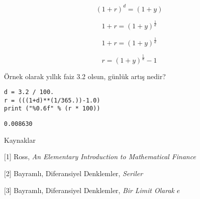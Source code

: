\documentclass[12pt,fleqn]{article}\usepackage{../../common}
\begin{document}
$$
(1+r)^d = (1+y) 
$$

$$
 1+r = (1+y)^{\frac{1}{d}} 
$$

$$
 1+r = (1+y)^{\frac{1}{d}} 
$$ 

$$
r =  (1+y)^{\frac{1}{d}} -1
$$

Örnek olarak yıllık faiz 3.2 olsun, günlük artış nedir?

\begin{verbatim}
d = 3.2 / 100.
r = (((1+d)**(1/365.))-1.0)
print ("%0.6f" % (r * 100))
\end{verbatim}

\begin{verbatim}
0.008630
\end{verbatim}

Kaynaklar

[1] Ross, {\em An Elementary Introduction to Mathematical Finance}

[2] Bayramlı, Diferansiyel Denklemler, {\em Seriler}

[3] Bayramlı, Diferansiyel Denklemler, {\em Bir Limit Olarak $e$}
\end{document}
